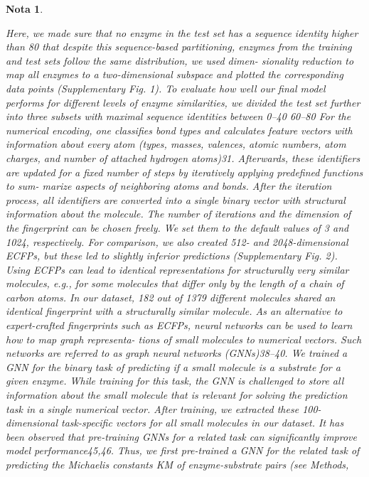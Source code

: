\documentclass[12pt]{article}
\newtheorem{Note}{Nota}%
\begin{document}
\begin{Note}
\begin{itemize}
Here,
we made sure that no enzyme in the test set has a sequence identity
higher than 80%
that despite this sequence-based partitioning, enzymes from the
training and test sets follow the same distribution, we used dimen-
sionality reduction to map all enzymes to a two-dimensional subspace
and plotted the corresponding data points (Supplementary Fig. 1). To
evaluate how well our ﬁnal model performs for different levels of
enzyme similarities, we divided the test set further into three subsets
with maximal sequence identities between 0–40%
60–80%
For the numerical encoding, one classiﬁes bond types and calculates
feature vectors with information about every atom (types, masses,
valences, atomic numbers, atom charges, and number of attached
hydrogen atoms)31. Afterwards, these identiﬁers are updated for a ﬁxed
number of steps by iteratively applying predeﬁned functions to sum-
marize aspects of neighboring atoms and bonds. After the iteration
process, all identiﬁers are converted into a single binary vector with
structural information about the molecule. The number of iterations
and the dimension of the ﬁngerprint can be chosen freely. We set them
to the default values of 3 and 1024, respectively. For comparison, we
also created 512- and 2048-dimensional ECFPs, but these led to slightly
inferior predictions (Supplementary Fig. 2). Using ECFPs can lead to
identical representations for structurally very similar molecules, e.g.,
for some molecules that differ only by the length of a chain of carbon
atoms. In our dataset, 182 out of 1379 different molecules shared an
identical ﬁngerprint with a structurally similar molecule.
As an alternative to expert-crafted ﬁngerprints such as ECFPs,
neural networks can be used to learn how to map graph representa-
tions of small molecules to numerical vectors. Such networks are
referred to as graph neural networks (GNNs)38–40. We trained a GNN for
the binary task of predicting if a small molecule is a substrate for a
given enzyme. While training for this task, the GNN is challenged to
store all information about the small molecule that is relevant for
solving the prediction task in a single numerical vector. After training,
we extracted these 100-dimensional task-speciﬁc vectors for all small
molecules in our dataset. It has been observed that pre-training GNNs
for a related task can signiﬁcantly improve model performance45,46.
Thus, we ﬁrst pre-trained a GNN for the related task of predicting the
Michaelis constants KM of enzyme-substrate pairs (see Methods,

\end{itemize}
\end{Note}
\end{document}
